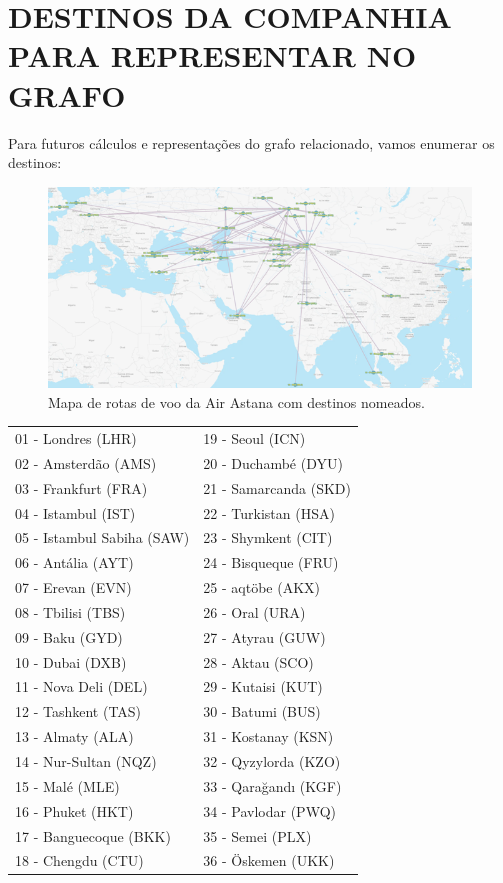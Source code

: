 \section{DESTINOS DA COMPANHIA PARA REPRESENTAR NO GRAFO}
Para futuros cálculos e representações do grafo relacionado, vamos enumerar os destinos:\\

\begin{figure}[h]
    \centering
    \includegraphics[width=1\textwidth]{imgs/Figura2}
    \caption{Mapa de rotas de voo da Air Astana com destinos nomeados.\label{fig:imagem2}}
\end{figure}


\begin{center}
\begin{tabular}{ l l }
        01 - Londres (LHR) & 19 - Seoul (ICN)\\
        02 - Amsterdão (AMS) & 20 - Duchambé (DYU)\\
        03 - Frankfurt (FRA) & 21 - Samarcanda (SKD)\\
        04 - Istambul (IST) &  22 - Turkistan (HSA)\\
        05 - Istambul Sabiha (SAW) & 23 - Shymkent (CIT)\\
        06 - Antália (AYT) & 24 - Bisqueque (FRU)\\
        07 - Erevan (EVN) & 25 - aqtöbe (AKX)\\
        08 - Tbilisi (TBS) & 26 - Oral (URA)\\
        09 - Baku (GYD) & 27 - Atyrau (GUW)\\
        10 - Dubai (DXB) & 28 - Aktau (SCO)\\
        11 - Nova Deli (DEL) & 29 - Kutaisi (KUT)\\
        12 - Tashkent (TAS) &  30 - Batumi (BUS)\\
        13 - Almaty (ALA) & 31 - Kostanay (KSN)\\
        14 - Nur-Sultan (NQZ) &  32 - Qyzylorda (KZO)\\
        15 - Malé (MLE) & 33 - Qarağandı (KGF)\\
        16 - Phuket (HKT) & 34 - Pavlodar (PWQ)\\
        17 - Banguecoque (BKK) & 35 - Semei (PLX)\\
        18 - Chengdu (CTU) & 36 - Öskemen (UKK)\\
\end{tabular}
\end{center}
